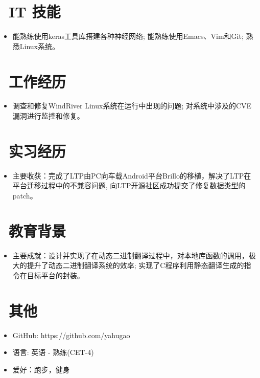 \documentclass{resume}
\begin{document}



\section{\faCogs\ IT 技能}
\begin{itemize}[parsep=0.5ex]
  \item {能熟练使用keras工具库搭建各种神经网络; 能熟练使用Emacs、Vim和Git; 熟悉Linux系统。}
\end{itemize}
  
\section{\faUsers\ 工作经历}
\begin{itemize}
    \item {调查和修复WindRiver Linux系统在运行中出现的问题; 对系统中涉及的CVE漏洞进行监控和修复。}
\end{itemize}

\section{\faUsers\ 实习经历}
\begin{itemize}
    \item {主要收获：完成了LTP由PC向车载Android平台Brillo的移植，解决了LTP在平台迁移过程中的不兼容问题, 向LTP开源社区成功提交了修复数据类型的patch。}
\end{itemize}

\section{\faGraduationCap\  教育背景}
\begin{itemize}
    \item {主要成就：设计并实现了在动态二进制翻译过程中，对本地库函数的调用，极大的提升了动态二进制翻译系统的效率; 实现了C程序利用静态翻译生成的指令在目标平台的封装。}
\end{itemize}

\section{\faInfo\ 其他}
\begin{itemize}[parsep=0.5ex]
  \item GitHub: https://github.com/yahugao
  \item 语言: 英语 - 熟练(CET-4)
  \item 爱好：跑步，健身
\end{itemize}
\end{document}
